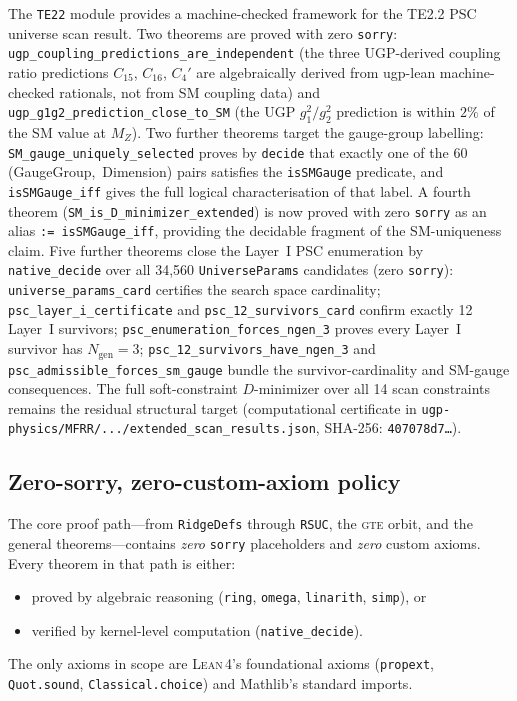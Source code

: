 \documentclass[11pt,a4paper]{article}
\theoremstyle{definition}
\newcommand{\gte}{\textsc{gte}}
\newcommand{\lean}{\textsc{Lean}\,4}
\begin{document}
The \texttt{TE22} module provides a machine-checked framework for
the TE2.2 PSC universe scan result.
Two theorems are proved with zero \texttt{sorry}:
\texttt{ugp\_coupling\_predictions\_are\_independent} (the three
UGP-derived coupling ratio predictions $C_{15}$, $C_{16}$, $C_4'$
are algebraically derived from ugp-lean machine-checked rationals,
not from SM coupling data) and
\texttt{ugp\_g1g2\_prediction\_close\_to\_SM} (the UGP $g_1^2/g_2^2$
prediction is within $2\%$ of the SM value at $M_Z$).
Two further theorems target the gauge-group labelling: \texttt{SM\_gauge\_uniquely\_selected}
proves by \texttt{decide} that exactly one of the $60$
\mbox{(GaugeGroup, Dimension)} pairs satisfies the \texttt{isSMGauge} predicate, and
\texttt{isSMGauge\_iff} gives the full logical characterisation of that label.
A fourth theorem (\texttt{SM\_is\_D\_minimizer\_extended}) is now proved with
zero \texttt{sorry} as an alias \texttt{:=\ isSMGauge\_iff}, providing the
decidable fragment of the SM-uniqueness claim.
Five further theorems close the Layer~I PSC enumeration by \texttt{native\_decide}
over all 34,560 \texttt{UniverseParams} candidates (zero \texttt{sorry}):
\texttt{universe\_params\_card} certifies the search space cardinality;
\texttt{psc\_layer\_i\_certificate} and \texttt{psc\_12\_survivors\_card}
confirm exactly 12 Layer~I survivors;
\texttt{psc\_enumeration\_forces\_ngen\_3} proves every Layer~I survivor has
$N_{\mathrm{gen}} = 3$;
\texttt{psc\_12\_survivors\_have\_ngen\_3} and
\texttt{psc\_admissible\_forces\_sm\_gauge} bundle the survivor-cardinality and
SM-gauge consequences.
The full soft-constraint $D$-minimizer over all 14 scan constraints remains
the residual structural target (computational certificate in
\texttt{ugp-physics/MFRR/.../extended\_scan\_results.json},
SHA-256: \texttt{407078d7\ldots}).

\subsection{Zero-sorry, zero-custom-axiom policy}

The core proof path---from \texttt{RidgeDefs} through \texttt{RSUC},
the \gte{} orbit, and the general theorems---contains \emph{zero}
\texttt{sorry} placeholders and \emph{zero} custom axioms.  Every
theorem in that path is either:
\begin{itemize}[nosep]
\item proved by algebraic reasoning (\texttt{ring}, \texttt{omega},
  \texttt{linarith}, \texttt{simp}), or
\item verified by kernel-level computation (\texttt{native\_decide}).
\end{itemize}
The only axioms in scope are \lean{}'s foundational axioms
(\texttt{propext}, \texttt{Quot.sound}, \texttt{Classical.\allowbreak choice})
and Mathlib's standard imports.
\end{document}
